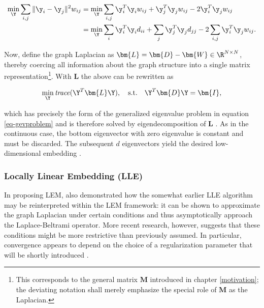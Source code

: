\begin{equation*}
  \begin{split}
    \min_{\Y} \sum_{i, j} \| \y_i - \y_j \|^2 w_{ij}
    &= \min_{\Y} \sum_{i, j} \y_i^T \y_i w_{ij} + \y_j^T \y_j w_{ij} - 
    2 \y_i^T \y_j w_{ij} \\
    &= \min_{\Y} \sum_i \y_i^T \y_i d_{ii} + \sum_j \y_j^T \y_j d_{jj} - 
    2 \sum_{i, j} \y_i^T \y_j w_{ij}.
  \end{split}
\end{equation*}

Now, define the graph Laplacian as 
$\bm{L} = \bm{D} - \bm{W} \in \R^{N \times N}$, thereby coercing all information 
about the graph structure into a single matrix representation\footnote{
This corresponds to the general matrix $\bm{M}$ introduced in chapter
\ref{motivation}; the deviating notation shall merely emphasize the special 
role of $\bm{M}$ as the Laplacian.}.
With $\bm{L}$ the above can be rewritten as

\begin{equation}
  \min_{\Y} \text{\textit{trace}}(\Y^T \bm{L} \Y), \quad \text{s.t.} 
      \quad \Y^T \bm{D} \Y = \bm{I},
\end{equation}

which has precisely the form of the generalized eigenvalue problem in equation 
\ref{eq-gevproblem} and is therefore solved by eigendecomposition of $\bm{L}$ \citep{belkinniyogi2003}.
As in the continuous case, the bottom eigenvector with zero eigenvalue is 
constant and must be discarded.
The subsequent $d$ eigenvectors yield the desired low-dimensional 
embedding \citep{levy2006}.


\subsubsection{Locally Linear Embedding (LLE)}
\label{lle}

In proposing LEM, \citet{belkinniyogi2003} also demonstrated how the somewhat 
earlier LLE algorithm may be reinterpreted within the LEM framework: it can be 
shown to approximate the graph Laplacian under certain conditions and thus asymptotically approach the Laplace-Beltrami operator.
More recent research, however, suggests that these conditions might be more restrictive than previously assumed. 
In particular, convergence appears to depend on the choice of a regularization 
parameter that will be shortly introduced \citep{wuwu2018}.
\\

